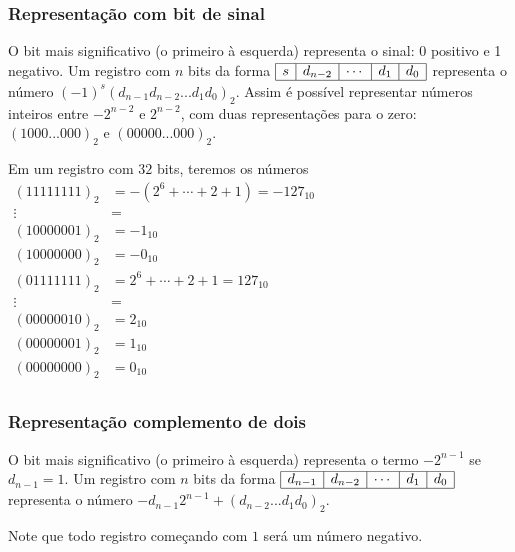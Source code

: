 \subsubsection{Representação com bit de sinal}
O bit mais significativo (o primeiro à esquerda) representa o sinal: 0 positivo e 1 negativo. Um registro com $n$ bits da forma
$
\begin{array}{|c|c|c|c|c|} \hline
s&d_{n-2}&\cdots&d_1&d_0\\\hline
\end{array}
$
representa o número $(-1)^s(d_{n-1}d_{n-2}...d_1d_0)_2$. Assim é possível representar números inteiros entre $-2^{n-2}$ e $2^{n-2}$, com duas representações para o zero: $(1000...000)_2$ e $(00000...000)_2$.
\begin{ex}
Em um registro com $32$ bits, teremos os números
$
\begin{array}{cl}
 (11111111)_2 &= -(2^{6}+\cdots+2+1)=-127_{10}\\
     \vdots    &=  \\
 (10000001)_2 &= -1_{10} \\
 (10000000)_2 &= -0_{10} \\
 (01111111)_2 &= 2^6+\cdots+2+1=127_{10} \\
     \vdots    &=  \\
 (00000010)_2 &= 2_{10} \\
 (00000001)_2 &= 1_{10} \\
 (00000000)_2 &= 0_{10} \\
\end{array}
$
\end{ex}


\subsubsection{Representação complemento de dois}
O bit mais significativo (o primeiro à esquerda) representa o termo $-2^{n-1}$ se $d_{n-1}=1$.  Um registro com $n$ bits da forma
$
\begin{array}{|c|c|c|c|c|} \hline
d_{n-1}&d_{n-2}&\cdots&d_1&d_0\\\hline
\end{array}
$
representa o número $-d_{n-1}2^{n-1}+(d_{n-2}...d_1d_0)_2$. 

Note que todo registro começando com $1$ será um número negativo.

